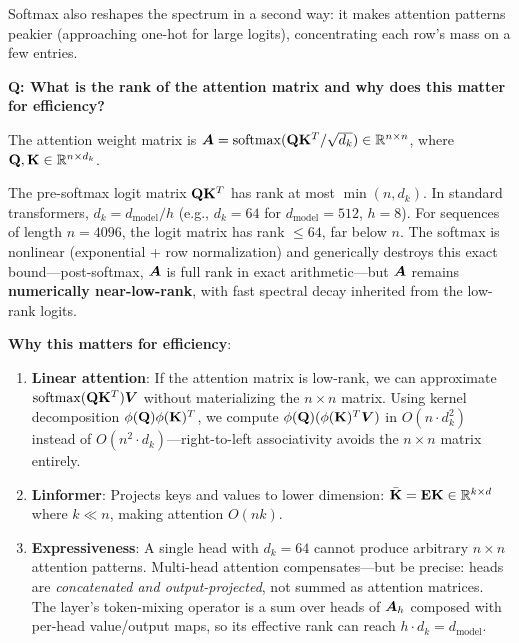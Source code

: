 Softmax also reshapes the spectrum in a second way: it makes attention patterns peakier (approaching one-hot for large logits), concentrating each row's mass on a few entries.

\begin{interviewq}
\textbf{Q: What is the rank of the attention matrix and why does this matter for efficiency?}

 \quad {} \quad \badgefreq{\freqlow}

\stronganswer
The attention weight matrix is $\bm{A} = \operatorname{softmax}(\mathbf{Q} \mathbf{K}^T / \sqrt{d_k}) \in \mathbb{R}^{n \times n}$, where $\mathbf{Q}, \mathbf{K} \in \mathbb{R}^{n \times d_k}$.

The pre-softmax logit matrix $\mathbf{Q} \mathbf{K}^T$ has rank at most $\min(n, d_k)$. In standard transformers, $d_k = d_{\text{model}} / h$ (e.g., $d_k = 64$ for $d_{\text{model}} = 512$, $h = 8$). For sequences of length $n = 4096$, the logit matrix has rank $\leq 64$, far below $n$. The softmax is nonlinear (exponential + row normalization) and generically destroys this exact bound---post-softmax, $\bm{A}$ is full rank in exact arithmetic---but $\bm{A}$ remains \textbf{numerically near-low-rank}, with fast spectral decay inherited from the low-rank logits.

\textbf{Why this matters for efficiency}:
\begin{enumerate}
    \item \textbf{Linear attention}: If the attention matrix is low-rank, we can approximate $\operatorname{softmax}(\mathbf{Q} \mathbf{K}^T)\bm{V}$ without materializing the $n \times n$ matrix. Using kernel decomposition $\phi(\mathbf{Q}) \phi(\mathbf{K})^T$, we compute $\phi(\mathbf{Q})(\phi(\mathbf{K})^T \bm{V})$ in $O(n \cdot d_k^2)$ instead of $O(n^2 \cdot d_k)$---right-to-left associativity avoids the $n \times n$ matrix entirely.
    \item \textbf{Linformer}: Projects keys and values to lower dimension: $\bar{\mathbf{K}} = \mathbf{E} \mathbf{K} \in \mathbb{R}^{k \times d}$ where $k \ll n$, making attention $O(nk)$.
    \item \textbf{Expressiveness}: A single head with $d_k = 64$ cannot produce arbitrary $n \times n$ attention patterns. Multi-head attention compensates---but be precise: heads are \textit{concatenated and output-projected}, not summed as attention matrices. The layer's token-mixing operator is a sum over heads of $\bm{A}_h$ composed with per-head value/output maps, so its effective rank can reach $h \cdot d_k = d_{\text{model}}$.
\end{enumerate}


\end{interviewq}
